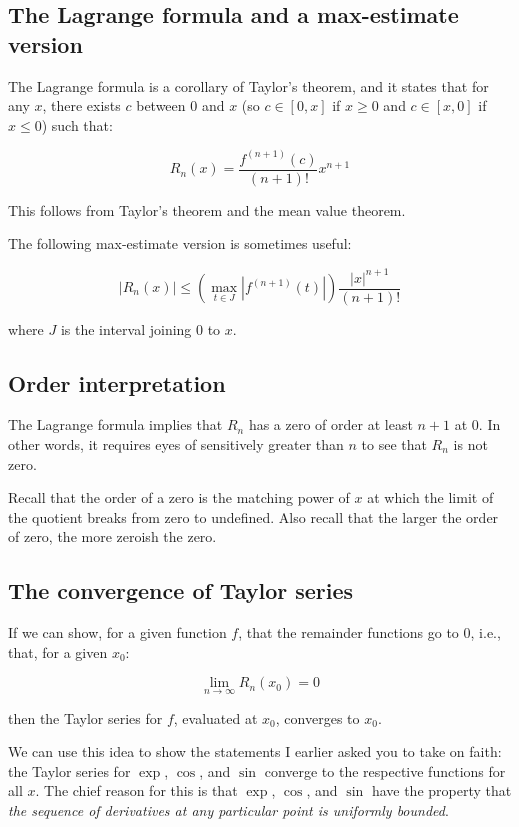\documentclass{amsart}
\begin{document}
\subsection{The Lagrange formula and a max-estimate version} 

The Lagrange formula is a corollary of Taylor's theorem, and it states
that for any $x$, there exists $c$ between $0$ and $x$ (so $c \in
[0,x]$ if $x \ge 0$ and $c \in [x,0]$ if $x \le 0$) such that:

$$R_n(x) = \frac{f^{(n+1)}(c)}{(n + 1)!}x^{n+1}$$

This follows from Taylor's theorem and the mean value theorem.

The following max-estimate version is sometimes useful:

$$|R_n(x)| \le \left( \max_{t \in J} |f^{(n+1)}(t)|\right) \frac{|x|^{n+1}}{(n+1)!}$$

where $J$ is the interval joining $0$ to $x$.

\subsection{Order interpretation}

The Lagrange formula implies that $R_n$ has a zero of order at least
$n + 1$ at $0$. In other words, it requires eyes of sensitively
greater than $n$ to see that $R_n$ is not zero.

Recall that the order of a zero is the matching power of $x$ at which
the limit of the quotient breaks from zero to undefined. Also recall
that the larger the order of zero, the more zeroish the zero.

\subsection{The convergence of Taylor series}

If we can show, for a given function $f$, that the remainder functions
go to $0$, i.e., that, for a given $x_0$:

$$\lim_{n \to \infty} R_n(x_0) = 0$$

then the Taylor series for $f$, evaluated at $x_0$, converges to $x_0$.

We can use this idea to show the statements I earlier asked you to
take on faith: the Taylor series for $\exp$, $\cos$, and $\sin$
converge to the respective functions for all $x$. The chief reason for
this is that $\exp$, $\cos$, and $\sin$ have the property that {\em
the sequence of derivatives at any particular point is uniformly
bounded}.
\end{document}
